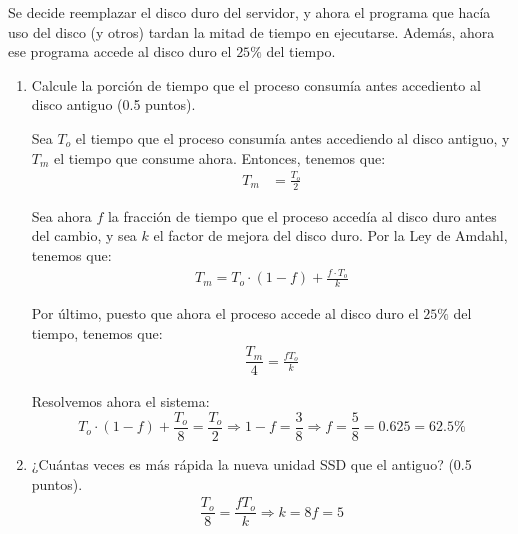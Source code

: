 \documentclass[12pt]{article}
\begin{document}
    \newpage
    \setcounter{ejercicio}{0}
    \begin{ejercicio}[1 punto]
        Se decide reemplazar el disco duro del servidor, y ahora el programa que hacía uso del disco (y otros) tardan la mitad de tiempo en ejecutarse. Además, ahora ese programa accede al disco duro el $25\%$ del tiempo.
        \begin{enumerate}
            \item Calcule la porción de tiempo que el proceso consumía antes accediento al disco antiguo (0.5 puntos).
            
            Sea $T_o$ el tiempo que el proceso consumía antes accediendo al disco antiguo, y $T_m$ el tiempo que consume ahora. Entonces, tenemos que:
            \begin{align*}
                T_m &= \frac{T_o}{2}
            \end{align*}

            Sea ahora $f$ la fracción de tiempo que el proceso accedía al disco duro antes del cambio, y sea $k$ el factor de mejora del disco duro. Por la Ley de Amdahl, tenemos que:
            \begin{align*}
                T_m = T_o \cdot (1 - f) + \frac{f \cdot T_o}{k}
            \end{align*}

            Por último, puesto que ahora el proceso accede al disco duro el $25\%$ del tiempo, tenemos que:
            \begin{align*}
                \dfrac{T_m}{4} = \frac{fT_o}{k}
            \end{align*}

            Resolvemos ahora el sistema:
            \begin{equation*}
                T_o\cdot (1 - f) + \dfrac{T_o}{8}
                = \dfrac{T_o}{2}
                \Longrightarrow
                1-f = \dfrac{3}{8}
                \Longrightarrow f = \dfrac{5}{8} = 0.625 = 62.5\%
            \end{equation*}
            \item ¿Cuántas veces es más rápida la nueva unidad SSD que el antiguo? (0.5 puntos).
            \begin{align*}
                \dfrac{T_o}{8} = \dfrac{fT_o}{k}
                \Longrightarrow k = 8f = 5
            \end{align*}
        \end{enumerate}
    \end{ejercicio}
\end{document}
